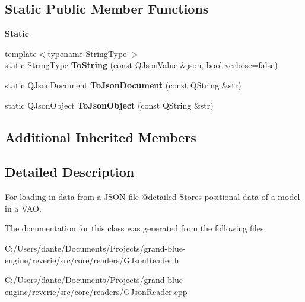 \subsection*{Static Public Member Functions}
\begin{Indent}\textbf{ Static}\par
\begin{DoxyCompactItemize}
\item 
\mbox{\label{classrev_1_1_json_reader_a81cd4ffd5bc13db8e4c27f6e7fe635b5}} 
{\footnotesize template$<$typename String\+Type $>$ }\\static String\+Type {\bfseries To\+String} (const Q\+Json\+Value \&json, bool verbose=false)
\item 
\mbox{\label{classrev_1_1_json_reader_ab404e23a1f9b6801b01fc90e1226a109}} 
static Q\+Json\+Document {\bfseries To\+Json\+Document} (const Q\+String \&str)
\item 
\mbox{\label{classrev_1_1_json_reader_a90c4662093bf19ecc47a30aa04b51b5e}} 
static Q\+Json\+Object {\bfseries To\+Json\+Object} (const Q\+String \&str)
\end{DoxyCompactItemize}
\end{Indent}
\subsection*{Additional Inherited Members}


\subsection{Detailed Description}
For loading in data from a J\+S\+ON file @detailed Stores positional data of a model in a V\+AO. 

The documentation for this class was generated from the following files\+:\begin{DoxyCompactItemize}
\item 
C\+:/\+Users/dante/\+Documents/\+Projects/grand-\/blue-\/engine/reverie/src/core/readers/G\+Json\+Reader.\+h\item 
C\+:/\+Users/dante/\+Documents/\+Projects/grand-\/blue-\/engine/reverie/src/core/readers/G\+Json\+Reader.\+cpp\end{DoxyCompactItemize}
